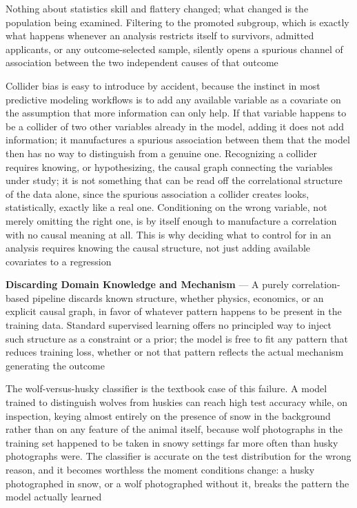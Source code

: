 Nothing about statistics skill and flattery changed; what changed is the population
being examined. Filtering to the promoted subgroup, which is exactly what happens
whenever an analysis restricts itself to survivors, admitted applicants, or any outcome-selected
sample, silently opens a spurious channel of association between the two
independent causes of that outcome

Collider bias is easy to introduce by accident, because the instinct in most
predictive modeling workflows is to add any available variable as a covariate on
the assumption that more information can only help. If that variable happens to be
a collider of two other variables already in the model, adding it does not add
information; it manufactures a spurious association between them that the model then
has no way to distinguish from a genuine one. Recognizing a collider requires
knowing, or hypothesizing, the causal graph connecting the variables under study;
it is not something that can be read off the correlational structure of the data
alone, since the spurious association a collider creates looks, statistically,
exactly like a real one. Conditioning on the wrong variable, not merely omitting
the right one, is by itself enough to manufacture a correlation with no causal meaning
at all. This is why deciding what to control for in an analysis requires knowing
the causal structure, not just adding available covariates to a regression

\textbf{Discarding Domain Knowledge and Mechanism} --- A purely correlation-based
pipeline discards known structure, whether physics, economics, or an explicit
causal graph, in favor of whatever pattern happens to be present in the training
data. Standard supervised learning offers no principled way to inject such
structure as a constraint or a prior; the model is free to fit any pattern that reduces
training loss, whether or not that pattern reflects the actual mechanism
generating the outcome

The wolf-versus-husky classifier is the textbook case of this failure. A model
trained to distinguish wolves from huskies can reach high test accuracy while, on
inspection, keying almost entirely on the presence of snow in the background
rather than on any feature of the animal itself, because wolf photographs in the
training set happened to be taken in snowy settings far more often than husky photographs
were. The classifier is accurate on the test distribution for the wrong reason, and
it becomes worthless the moment conditions change: a husky photographed in snow,
or a wolf photographed without it, breaks the pattern the model actually learned

